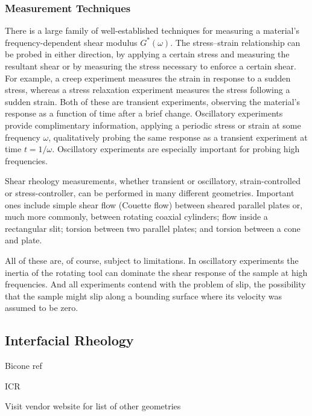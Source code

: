 \subsubsection{Measurement Techniques}

There is a large family of well-established techniques for measuring a material's frequency-dependent shear modulus $G^*(\omega)$. The stress--strain relationship can be probed in either direction, by applying a certain stress and measuring the resultant shear or by measuring the stress necessary to enforce a certain shear. For example, a creep experiment measures the strain in response to a sudden stress, whereas a stress relaxation experiment measures the stress following a sudden strain. Both of these are transient experiments, observing the material's response as a function of time after a brief change. Oscillatory experiments provide complimentary information, applying a periodic stress or strain at some frequency $\omega$, qualitatively probing the same response as a transient experiment at time $t=1/\omega$. Oscillatory experiments are especially important for probing high frequencies.

Shear rheology measurements, whether transient or oscillatory, strain-controlled or stress-controller, can be performed in many different geometries. Important ones include simple shear flow (Couette flow) between sheared parallel plates or, much more commonly, between rotating coaxial cylinders; flow inside a rectangular slit; torsion between two parallel plates; and torsion between a cone and plate.

All of these are, of course, subject to limitations. In oscillatory experiments the inertia of the rotating tool can dominate the shear response of the sample at  high frequencies. And all experiments contend with the problem of slip, the possibility that the sample might slip along a bounding surface where its velocity was assumed to be zero.

\subsection{Interfacial Rheology}




Bicone ref

ICR

Visit vendor website for list of other geometries

